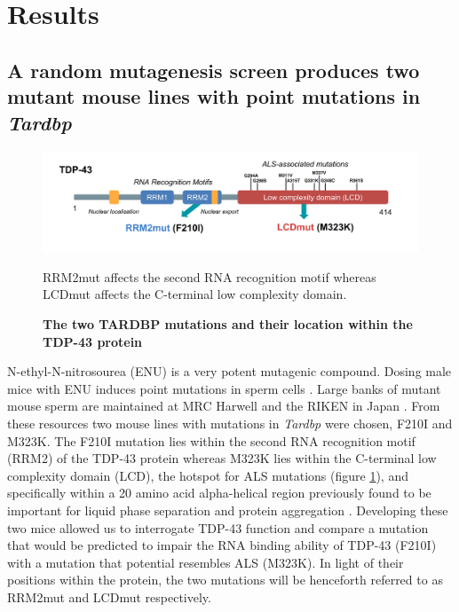 \section{Results}

\subsection{A random mutagenesis screen produces two mutant mouse lines with point mutations in \textit{Tardbp}}

\begin{figure}[h!]
	\centering
	\includegraphics[scale=0.6]{Figures/05_tdp_mice/TDP_structure_mutations.png}
	\caption{\textbf{The two TARDBP mutations and their location within the TDP-43 protein}}
	RRM2mut affects the second RNA recognition motif whereas LCDmut affects the C-terminal low complexity domain.
	\label{fig:tdp_structure}
\end{figure}

N-ethyl-N-nitrosourea (ENU) is a very potent mutagenic compound. Dosing male mice with ENU induces point mutations in sperm cells \citep{DeAngelis2000}. Large banks of mutant mouse sperm are maintained at MRC Harwell \citep{Acevedo2008} and the RIKEN in Japan \citep{Gondo2010}. From these resources two mouse lines with mutations in \textit{Tardbp} were chosen, F210I and M323K. The F210I mutation lies within the second RNA recognition motif (RRM2) of the TDP-43 protein whereas M323K lies within the C-terminal low complexity domain (LCD), the hotspot for ALS mutations (figure \ref{fig:tdp_structure}), and specifically within a 20 amino acid alpha-helical region previously found to be important for liquid phase separation and protein aggregation \citep{Conicella2016}. Developing these two mice allowed us to interrogate TDP-43 function and compare a mutation that would be predicted to impair the RNA binding ability of TDP-43 (F210I) with a mutation that potential resembles ALS (M323K). In light of their positions within the protein, the two mutations will be henceforth referred to as RRM2mut and LCDmut respectively.



